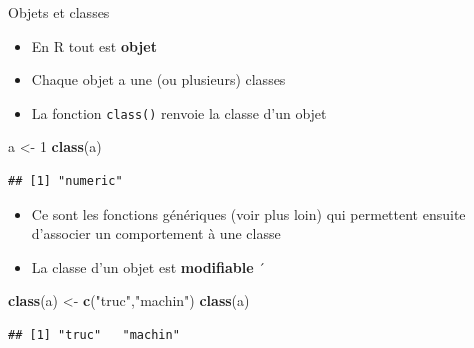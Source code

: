 \documentclass[
  ignorenonframetext,
]{beamer}
\newenvironment{Shaded}{\begin{snugshade}}{\end{snugshade}}
\newcommand{\DecValTok}[1]{\textcolor[rgb]{0.00,0.00,0.81}{#1}}
\newcommand{\FunctionTok}[1]{\textcolor[rgb]{0.13,0.29,0.53}{\textbf{#1}}}
\newcommand{\NormalTok}[1]{#1}
\newcommand{\OtherTok}[1]{\textcolor[rgb]{0.56,0.35,0.01}{#1}}
\newcommand{\StringTok}[1]{\textcolor[rgb]{0.31,0.60,0.02}{#1}}
\providecommand{\tightlist}{%
  \setlength{\itemsep}{0pt}\setlength{\parskip}{0pt}}
\begin{document}
\begin{frame}[fragile]{Objets et classes}
\protect\hypertarget{objets-et-classes}{}
\begin{itemize}
\tightlist
\item
  En R tout est \textbf{objet}
\item
  Chaque objet a une (ou plusieurs) classes
\item
  La fonction \texttt{class()} renvoie la classe d'un objet
\end{itemize}

\tiny

\begin{Shaded}
\begin{Highlighting}[]
\NormalTok{a }\OtherTok{\textless{}{-}} \DecValTok{1}
\FunctionTok{class}\NormalTok{(a)}
\end{Highlighting}
\end{Shaded}

\begin{verbatim}
## [1] "numeric"
\end{verbatim}

\normalsize

\begin{itemize}
\item
  Ce sont les fonctions génériques (voir plus loin) qui permettent
  ensuite d'associer un comportement à une classe
\item
  La classe d'un objet est \textbf{modifiable} ´
\end{itemize}

\tiny

\begin{Shaded}
\begin{Highlighting}[]
\FunctionTok{class}\NormalTok{(a) }\OtherTok{\textless{}{-}} \FunctionTok{c}\NormalTok{(}\StringTok{"truc"}\NormalTok{,}\StringTok{"machin"}\NormalTok{)}
\FunctionTok{class}\NormalTok{(a)}
\end{Highlighting}
\end{Shaded}

\begin{verbatim}
## [1] "truc"   "machin"
\end{verbatim}

\normalsize
\end{frame}
\end{document}
